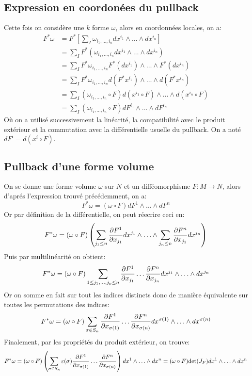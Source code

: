    \subsection*{Expression en coordonées du pullback}
      Cette fois on considère une $k$ forme $\omega$, alors en coordonnées locales, on a:
      \begin{align*}
      F^*\omega &= F^*\left[\sum_{I} \omega_{i_1, \ldots, i_n} dx^{i_1} \wedge \ldots \wedge dx^{i_n}\right]\\
      &= \sum_{I} F^*(\omega_{i_1, \ldots, i_n} dx^{i_1} \wedge \ldots \wedge dx^{i_n})\\
      &= \sum_{I} F^*\omega_{i_1, \ldots, i_n} F^*(dx^{i_1})  \wedge \ldots \wedge F^*(dx^{i_n})\\
      &= \sum_{I} F^*\omega_{i_1, \ldots, i_n} d(F^*x^{i_1})  \wedge \ldots \wedge d(F^*x^{i_n})\\
      &= \sum_{I} (\omega_{i_1, \ldots, i_n} \circ F) d(x^{i_1} \circ F)  \wedge \ldots \wedge d(x^{i_n} \circ F)\\
      &= \sum_{I} (\omega_{i_1, \ldots, i_n} \circ F) dF^{i_1}  \wedge \ldots \wedge  dF^{i_n}
      \end{align*}
      Où on a utilisé successivement la linéarité, la compatibilité avec le produit extérieur et la commutation avec la différentielle usuelle du pullback. On a noté $dF^i = d(x^i \circ F)$.
   \subsection*{Pullback d'une forme volume}
      On se donne une forme volume $\omega$ sur $N$ et un difféomorphisme $F : M \longrightarrow N$, alors d'aprés l'expression trouvé précédemment, on a:
      $$
          F^*\omega = (\omega \circ F) dF^{1}  \wedge \ldots \wedge  dF^{n}
      $$
      Or par définition de la différentielle, on peut réecrire ceci en:
      \[ 
         F^*\omega = (\omega \circ F) \left(\sum_{{j_1} \leq n} \frac{\partial F^{1}}{\partial x_{j_1}}dx^{j_1}  \wedge \ldots \wedge  \sum_{{j_n} \leq n} \frac{\partial F^{n}}{\partial x_{j_1}}dx^{j_n}\right)
      \]
      Puis par multilinéarité on obtient:
      \[ 
         F^*\omega = (\omega \circ F) \sum_{1 \leq j_1, \ldots, j_p \leq n} \frac{\partial F^{1}}{\partial x_{j_1}}\ldots\frac{\partial F^{n}}{\partial x_{j_n}} dx^{j_1}  \wedge \ldots \wedge  dx^{j_n}
      \]
      Or on somme en fait sur tout les indices distincts donc de manière équivalente sur toutes les permutations des indices:
      \[ 
         F^*\omega = (\omega \circ F) \sum_{\sigma \in S_n} \frac{\partial F^{1}}{\partial x_{\sigma(1)}}\ldots\frac{\partial F^{n}}{\partial x_{\sigma(n)}} dx^{\sigma(1)}\wedge \ldots \wedge  dx^{\sigma(n)}
      \]
      Finalement, par les propriétés du produit extérieur, on trouve:
      \[ 
         F^*\omega = (\omega \circ F) \left(\sum_{\sigma \in S_n} \varepsilon(\sigma)\frac{\partial F^{1}}{\partial x_{\sigma(1)}}\ldots\frac{\partial F^{n}}{\partial x_{\sigma(n)}}\right) dx^{1}\wedge \ldots \wedge  dx^{n} = (\omega \circ F)\text{det}(J_F)dx^1 \wedge \ldots \wedge dx^n
      \]
